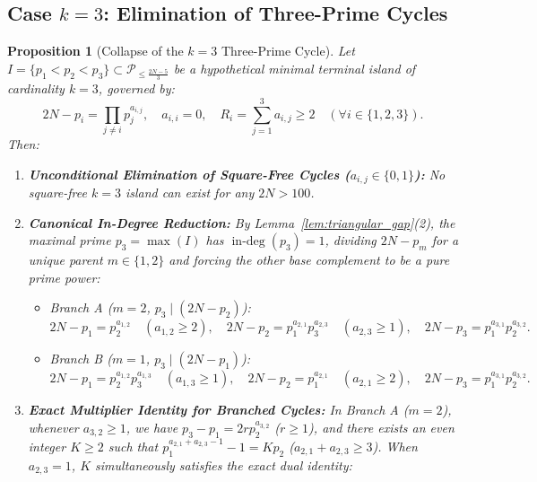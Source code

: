 \documentclass[11pt,a4paper]{article}
\newtheorem{proposition}[theorem]{Proposition}
\theoremstyle{definition}
\begin{document}
\subsection{Case \texorpdfstring{$k = 3$}{k = 3}: Elimination of Three-Prime Cycles}
\label{subsec:k3}

\begin{proposition}[Collapse of the $k=3$ Three-Prime Cycle]
\label{prop:k3_collapse}
Let $I = \{p_1 < p_2 < p_3\} \subset \mathcal{P}_{\le \frac{2N-5}{3}}$ be a hypothetical minimal terminal island of cardinality $k = 3$, governed by:
\begin{equation}
\label{eq:k3_system_def}
2N - p_i = \prod_{j \neq i} p_j^{a_{i,j}}, \quad a_{i,i} = 0, \quad R_i = \sum_{j=1}^3 a_{i,j} \ge 2 \quad (\forall i \in \{1, 2, 3\}).
\end{equation}
Then:
\begin{enumerate}
    \item \textbf{Unconditional Elimination of Square-Free Cycles ($a_{i,j} \in \{0, 1\}$):} No square-free $k = 3$ island can exist for any $2N > 100$.
    \item \textbf{Canonical In-Degree Reduction:} By Lemma~\ref{lem:triangular_gap}(2), the maximal prime $p_3 = \max(I)$ has $\operatorname{in-deg}(p_3) = 1$, dividing $2N - p_m$ for a unique parent $m \in \{1, 2\}$ and forcing the other base complement to be a pure prime power:
    \begin{itemize}
        \item \emph{Branch A ($m = 2$, $p_3 \mid (2N - p_2)$):}
        \begin{equation}
        \label{eq:k3_canonical_system}
        2N - p_1 = p_2^{a_{1,2}} \quad (a_{1,2} \ge 2), \quad 2N - p_2 = p_1^{a_{2,1}} p_3^{a_{2,3}} \quad (a_{2,3} \ge 1), \quad 2N - p_3 = p_1^{a_{3,1}} p_2^{a_{3,2}}.
        \end{equation}
        \item \emph{Branch B ($m = 1$, $p_3 \mid (2N - p_1)$):}
        \begin{equation}
        \label{eq:k3_canonical_system_B}
        2N - p_1 = p_2^{a_{1,2}} p_3^{a_{1,3}} \quad (a_{1,3} \ge 1), \quad 2N - p_2 = p_1^{a_{2,1}} \quad (a_{2,1} \ge 2), \quad 2N - p_3 = p_1^{a_{3,1}} p_2^{a_{3,2}}.
        \end{equation}
    \end{itemize}
    \item \textbf{Exact Multiplier Identity for Branched Cycles:} In Branch A ($m = 2$), whenever $a_{3,2} \ge 1$, we have $p_3 - p_1 = 2r p_2^{a_{3,2}}$ ($r \ge 1$), and there exists an even integer $K \ge 2$ such that $p_1^{a_{2,1} + a_{2,3} - 1} - 1 = K p_2$ ($a_{2,1} + a_{2,3} \ge 3$). When $a_{2,3} = 1$, $K$ simultaneously satisfies the exact dual identity:

\end{enumerate}
\end{proposition}
\end{document}
